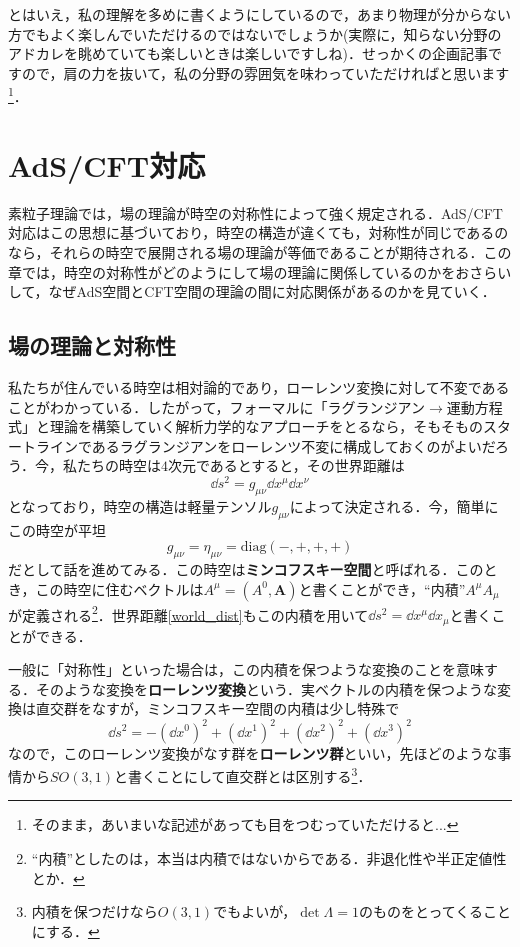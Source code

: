 \documentclass[a4paper,uplatex,dvipdfmx]{jsarticle}
\theoremstyle{definition}
\begin{document}
とはいえ，私の理解を多めに書くようにしているので，あまり物理が分からない方でもよく楽しんでいただけるのではないでしょうか(実際に，知らない分野のアドカレを眺めていても楽しいときは楽しいですしね)．せっかくの企画記事ですので，肩の力を抜いて，私の分野の雰囲気を味わっていただければと思います\footnote{
  そのまま，あいまいな記述があっても目をつむっていただけると...
}．


\clearpage

\section{AdS/CFT対応}

素粒子理論では，場の理論が時空の対称性によって強く規定される．AdS/CFT対応はこの思想に基づいており，時空の構造が違くても，対称性が同じであるのなら，それらの時空で展開される場の理論が等価であることが期待される．この章では，時空の対称性がどのようにして場の理論に関係しているのかをおさらいして，なぜAdS空間とCFT空間の理論の間に対応関係があるのかを見ていく．

\subsection{場の理論と対称性}
\label{symmetry}

私たちが住んでいる時空は相対論的であり，ローレンツ変換に対して不変であることがわかっている．したがって，フォーマルに「ラグランジアン$\rightarrow$運動方程式」と理論を構築していく解析力学的なアプローチをとるなら，そもそものスタートラインであるラグランジアンをローレンツ不変に構成しておくのがよいだろう．今，私たちの時空は$4$次元であるとすると，その世界距離は
\begin{equation}
  \dd s^2
  =
  g_{\mu\nu}\dd x^{\mu}\dd x^{\nu}
  \label{world_dist}
\end{equation}
となっており，時空の構造は軽量テンソル$g_{\mu\nu}$によって決定される．今，簡単にこの時空が平坦
\begin{equation}
  g_{\mu\nu}
  =
  \eta_{\mu\nu}
  =
  \text{diag}(-,+,+,+)
\end{equation}
だとして話を進めてみる．この時空は\textbf{ミンコフスキー空間}と呼ばれる．このとき，この時空に住むベクトルは$A^{\mu}=(A^{0},\bm{A})$と書くことができ，``内積''$A^{\mu}A_{\mu}$が定義される\footnote{
  ``内積''としたのは，本当は内積ではないからである．非退化性や半正定値性とか．
}．世界距離\eqref{world_dist}もこの内積を用いて$\dd s^2=\dd x^{\mu}\dd x_{\mu}$と書くことができる．

一般に「対称性」といった場合は，この内積を保つような変換のことを意味する．そのような変換を\textbf{ローレンツ変換}という．実ベクトルの内積を保つような変換は直交群をなすが，ミンコフスキー空間の内積は少し特殊で
\begin{equation}
  \dd s^2
  =
  -(\dd {x^{0}})^2
  +(\dd {x^{1}})^2
  +(\dd {x^{2}})^2
  +(\dd {x^{3}})^2
\end{equation}
なので，このローレンツ変換がなす群を\textbf{ローレンツ群}といい，先ほどのような事情から$SO(3,1)$と書くことにして直交群とは区別する\footnote{
  内積を保つだけなら$O(3,1)$でもよいが，$\det\Lambda=1$のものをとってくることにする．
}．
\end{document}
